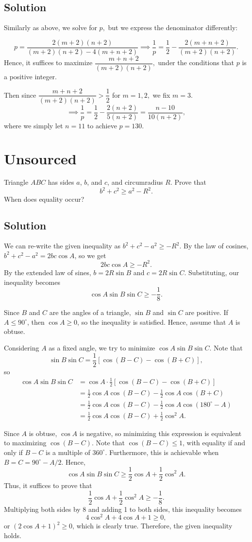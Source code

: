 \documentclass[blue,onecol]{shooting}
\begin{document}
\subsection{Solution}
Similarly as above, we solve for $p,$ but we express the denominator differently:

\[p=\dfrac{2(m+2)(n+2)}{(m+2)(n+2)-4(m+n+2)} \implies \dfrac{1}{p}=\dfrac{1}{2}-\dfrac{2(m+n+2)}{(m+2)(n+2)}.\]Hence, it suffices to maximize $\dfrac{m+n+2}{(m+2)(n+2)},$ under the conditions that $p$ is a positive integer.

Then since $\dfrac{m+n+2}{(m+2)(n+2)}>\dfrac{1}{2}$ for $m=1,2,$ we fix $m=3.$\[\implies \dfrac{1}{p}=\dfrac{1}{2}-\dfrac{2(n+2)}{5(n+2)}=\dfrac{n-10}{10(n+2)},\]where we simply let $n=11$ to achieve $p=\boxed{130}.$
\section{Unsourced}
Triangle $ABC$ has sides $a$, $b$, and $c$, and circumradius $R$. Prove that
\[b^2 + c^2 \ge a^2 - R^2.\]
When does equality occur?
\subsection{Solution}
We can re-write the given inequality as $b^2 + c^2 - a^2 \ge -R^2$. By the law of cosines, $b^2 + c^2 - a^2 = 2bc \cos A$, so we get
\[2bc \cos A \ge -R^2.\]
By the extended law of sines, $b = 2R \sin B$ and $c = 2R \sin C$. Substituting, our inequality becomes
\[\cos A \sin B \sin C \ge -\frac{1}{8}.\]

Since $B$ and $C$ are the angles of a triangle, $\sin B$ and $\sin C$ are positive. If $A \le 90^\circ$, then $\cos A \ge 0$, so the inequality is satisfied. Hence, assume that $A$ is obtuse.

Considering $A$ as a fixed angle, we try to minimize $\cos A \sin B \sin C$. Note that
\[\sin B \sin C = \frac{1}{2} [\cos (B - C) - \cos (B + C)],\]
so
\begin{align*}
\cos A \sin B \sin C &= \cos A \cdot \frac{1}{2} [\cos (B - C) - \cos (B + C)] \\
&= \frac{1}{2} \cos A \cos (B - C) - \frac{1}{2} \cos A \cos (B + C) \\
&= \frac{1}{2} \cos A \cos (B - C) - \frac{1}{2} \cos A \cos (180^\circ - A) \\
&= \frac{1}{2} \cos A \cos (B - C) + \frac{1}{2} \cos^2 A.
\end{align*}

Since $A$ is obtuse, $\cos A$ is negative, so minimizing this expression is equivalent to maximizing $\cos (B - C)$. Note that $\cos (B - C) \le 1$, with equality if and only if $B - C$ is a multiple of $360^\circ$. Furthermore, this is achievable when $B = C = 90^\circ - A/2$. Hence,
\[\cos A \sin B \sin C \ge \frac{1}{2} \cos A + \frac{1}{2} \cos^2 A.\]
Thus, it suffices to prove that
\[\frac{1}{2} \cos A + \frac{1}{2} \cos^2 A \ge -\frac{1}{8}.\]
Multiplying both sides by 8 and adding 1 to both sides, this inequality becomes
\[4 \cos^2 A + 4 \cos A + 1 \ge 0,\]
or $(2 \cos A + 1)^2 \ge 0$, which is clearly true. Therefore, the given inequality holds.
\end{document}

